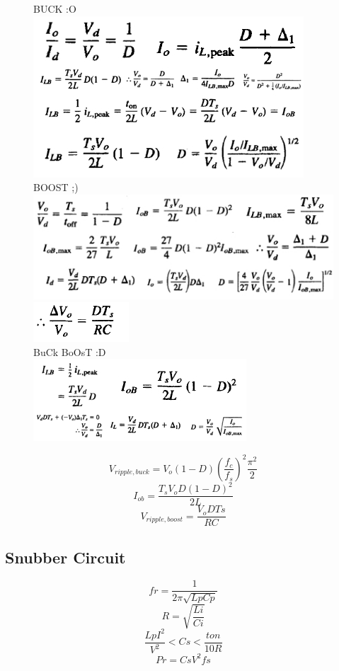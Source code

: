 \documentclass[twocolumn, ]{article}
\begin{document}
\begin{figure}
{BUCK :O}\\
\includegraphics[scale=1.2]{buck.jpg}
 {BOOST ;)}\\
\includegraphics[scale=1]{boost.jpg}\\

\includegraphics[scale=1]{9.png}\\
{BuCk BoOsT :D}\\
\includegraphics[scale=1.4]{buckboost.jpg}\\
\end{figure}
$$ V_{ripple,buck}=V_o (1-D) {(\dfrac{f_c}{f_s})}^2 \dfrac{\pi^2 }{2} $$ 
$$I_{ob}=\dfrac{T_s V_o  D (1-D)^2 }{2L} $$ 
$$ V_{ripple,boost}=\dfrac{V_o D Ts}{RC}$$
\subsection*{\small Snubber Circuit}
$$ fr=\dfrac{1}{2\pi \sqrt{LpCp}} $$
$$ R=\sqrt{\dfrac{Li}{Ci}} $$
$$ \dfrac{LpI^2}{V^2}<Cs<\dfrac{ton}{10R}$$
$$ Pr=CsV^2fs $$
\end{document}
